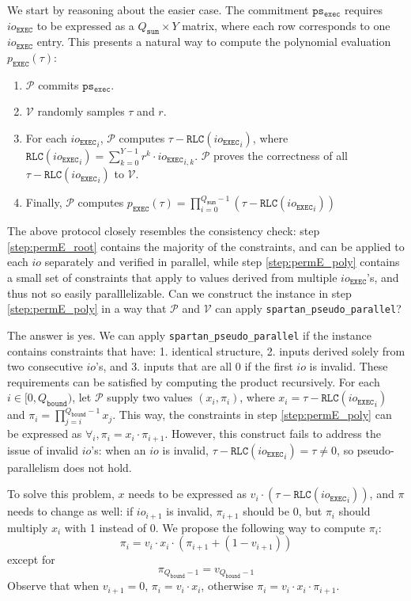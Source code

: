 \documentclass{article}
\newcommand{\code}{\texttt}
\newcommand{\Qbound}{Q_{\mathtt{bound}}}
\newcommand{\Qsum}{Q_{\mathtt{sum}}}
\renewcommand{\P}{\mathcal{P}}
\newcommand{\V}{\mathcal{V}}
\newcommand{\RLC}{\mathtt{RLC}}
\newcommand{\ioe}{io_{\mathtt{EXEC}}}
\newcommand{\pse}{\mathtt{ps_{exec}}}
\begin{document}
We start by reasoning about the easier case. The commitment $\pse$ requires $\ioe$ to be expressed as a $\Qsum\times Y$ matrix, where each row corresponds to one $\ioe$ entry. This presents a natural way to compute the polynomial evaluation $p_\mathtt{EXEC}(\tau)$:
\begin{enumerate}
    \item $\P$ commits $\pse$.
    \item $\V$ randomly samples $\tau$ and $r$.
    \item \label{step:permE_root} For each ${\ioe}_i$, $\P$ computes $\tau - \RLC({\ioe}_i)$, where $\RLC({\ioe}_i) = \sum_{k = 0}^{Y-1} r^k \cdot {\ioe}_{i, k}$. $\P$ proves the correctness of all $\tau - \RLC({\ioe}_i)$ to $\V$.
    \item \label{step:permE_poly} Finally, $\P$ computes $p_\mathtt{EXEC}(\tau) = \prod_{i = 0}^{\Qsum - 1}(\tau - \RLC({\ioe}_i))$
\end{enumerate}

The above protocol closely resembles the consistency check: step \ref{step:permE_root} contains the majority of the constraints, and can be applied to each $io$ separately and verified in parallel, while step \ref{step:permE_poly} contains a small set of constraints that apply to values derived from multiple $\ioe$'s, and thus not so easily paralllelizable. Can we construct the instance in step \ref{step:permE_poly} in a way that $\P$ and $\V$ can apply \code{spartan\_pseudo\_parallel}?

The answer is yes. We can apply \code{spartan\_pseudo\_parallel} if the instance contains constraints that have: 1. identical structure, 2. inputs derived solely from two consecutive $io$'s, and 3. inputs that are all 0 if the first $io$ is invalid. These requirements can be satisfied by computing the product recursively. For each $i\in[0, \Qbound)$, let $\P$ supply two values $(x_i, \pi_i)$, where $x_i = \tau - \RLC({\ioe}_i)$ and $\pi_i = \prod_{j = i}^{\Qbound - 1} x_j$. This way, the constraints in step \ref{step:permE_poly} can be expressed as $\forall_i, \pi_i = x_i \cdot \pi_{i+1}$. However, this construct fails to address the issue of invalid $io$'s: when an $io$ is invalid, $\tau - \RLC({\ioe}_i) = \tau\neq 0$, so pseudo-parallelism does not hold.

To solve this problem, $x$ needs to be expressed as $v_i \cdot (\tau - \RLC({\ioe}_i))$, and $\pi$ needs to change as well: if $io_{i + 1}$ is invalid, $\pi_{i + 1}$ should be 0, but $\pi_i$ should multiply $x_i$ with 1 instead of 0. We propose the following way to compute $\pi_i$:
$$\pi_i = v_i \cdot x_i \cdot (\pi_{i+1} + (1 - v_{i+1}))$$
except for
$$\pi_{\Qbound - 1} = v_{\Qbound - 1}$$
Observe that when $v_{i+1} = 0$, $\pi_i = v_i \cdot x_i$, otherwise $\pi_i = v_i \cdot x_i \cdot \pi_{i+1}$.
\end{document}
